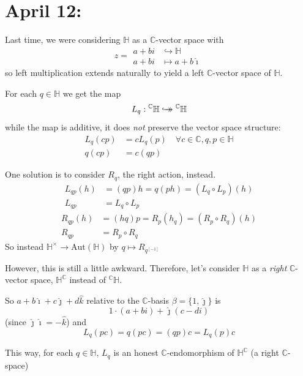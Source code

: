 \documentclass[12pt]{article}
\renewcommand{\hat}[1]{\widehat{#1}}
\newcommand{\C}{\mathbb{C}}
\renewcommand{\H}{\mathbb{H}}
\newcommand{\biject}{\hookrightarrow \hspace{-8pt} \rightarrow}
\newcommand{\Aut}{\text{Aut}}
\newcommand{\ihat}{\hat{\imath}}
\newcommand{\jhat}{\hat{\jmath}}
\newcommand{\khat}{\hat{k}}
\begin{document}
\section{April 12:}
    Last time, we were considering $\H$ as a $\C$-vector space with 
    \[z = \begin{aligned}
        a + bi &\hookrightarrow \H\\ 
        a + bi &\mapsto a + b\ihat
    \end{aligned}\]
    so left multiplication extends naturally to yield a left $\C$-vector space of $\H$. 

    For each $q \in \H$ we get the map 
    \[L_q: {}^{\C} \H \biject {}^{\C}\H\]
    while the map is additive, it does \emph{not} preserve the vector space structure:
    \begin{align*}
        L_q(cp) &= cL_q(p) \quad \forall c\in \C, q, p\in \H\\ 
        q(cp) &= c(qp) 
    \end{align*}

    One solution is to consider $R_q$, the right action, instead. 
    \begin{align*}
        L_{qp}(h) &= (qp)h = q(ph) = (L_q \circ L_p)(h)\\ 
        L_{qp} &= L_q \circ L_p
    \end{align*} 
    \begin{align*}
        R_{qp}(h) &= (hq)p = R_p(h_q) = (R_p \circ R_q)(h)\\
        R_{qp} &= R_p \circ R_q
    \end{align*}
    So instead $\H^{\times} \to \Aut(\H)$ by $q \mapsto R_{q^[-1]}$

    However, this is still a little awkward. Therefore, let's consider $\H$ as a \emph{right} $\C$-vector space, $\H^{\C}$ instead of ${}^{\C}\H$.

    So $a + b\ihat + c\jhat + d\khat$ relative to the $\C$-basis $\beta = \{1, \jhat\}$ is 
    \[1 \cdot (a + bi) + \jhat(c - di)\] 
    (since $\jhat \ihat = -\khat$) and 
    \[L_q(pc) = q(pc) = (qp)c = L_q(p)c\]

    This way, for each $q \in \H$, $L_q$ is an honest $\C$-endomorphism of $\H^{\C}$ (a right $\C$-space)
\end{document}
